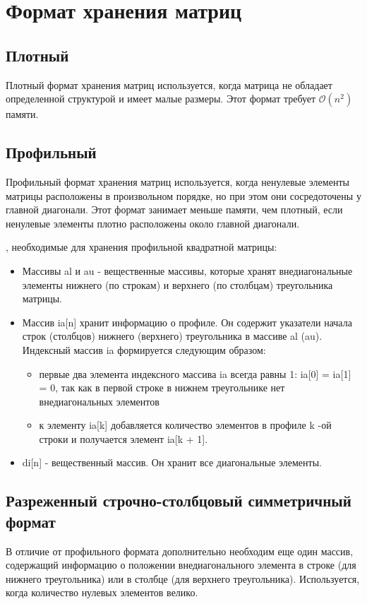 \documentclass[a4paper,12pt]{article}
\begin{document}
\section{Формат хранения матриц}
\subsection{Плотный}
Плотный формат хранения матриц используется, когда матрица не обладает определенной структурой и имеет малые размеры. Этот формат требует $\mathcal{O}(n^2)$ памяти.

\subsection{Профильный}
Профильный формат хранения матриц используется, когда ненулевые элементы матрицы расположены в произвольном порядке, но при этом они сосредоточены у главной диагонали. 
Этот формат занимает меньше памяти, чем плотный, если ненулевые элементы плотно расположены около главной диагонали.

, необходимые для хранения профильной квадратной матрицы:
\begin{itemize}
    \item Массивы al и au - вещественные массивы, которые хранят внедиагональные элементы нижнего (по строкам) и верхнего (по столбцам) треугольника матрицы.
    \item Массив ia[n] хранит информацию о профиле. Он содержит указатели начала строк (столбцов) нижнего (верхнего) треугольника в массиве al (au). Индексный массив ia формируется следующим образом:
\begin{itemize}
    \item первые два элемента индексного массива ia всегда равны 1: ia[0] = ia[1] = 0, так как в первой строке в нижнем треугольнике нет внедиагональных элементов
    \item к элементу ia[k] добавляется количество элементов в профиле k -ой строки и получается элемент ia[k + 1].
\end{itemize}
    \item di[n] - вещественный массив. Он хранит все диагональные элементы.
\end{itemize}

\subsection{Разреженный строчно-столбцовый симметричный формат}
В отличие от профильного формата дополнительно необходим еще один массив, содержащий информацию о положении внедиагонального элемента в строке (для нижнего треугольника) или в столбце (для верхнего треугольника). Используется, когда количество нулевых элементов велико.
\end{document}
